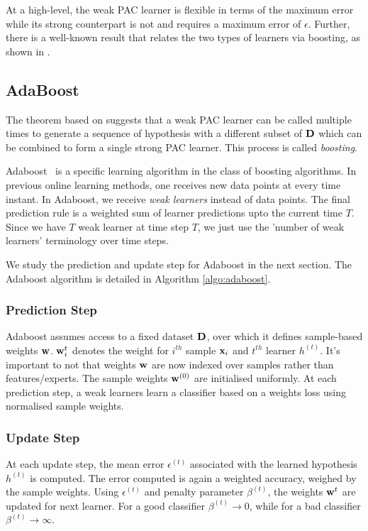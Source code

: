 \documentclass[11pt]{article}
\begin{document}
\normalfont
At a high-level, the weak PAC learner is flexible in terms of the maximum error while its strong
counterpart is not and requires a maximum error of $\epsilon$. Further, there is a well-known result that
relates the two types of learners via boosting, as shown in \cite{schapire1990strength}.

\subsection{AdaBoost}
The theorem based on \cite{schapire1990strength} suggests that a weak PAC learner can be called
multiple times to generate a sequence of hypothesis with a different subset of $\mathbf{D}$ which
can be combined to form a single strong PAC learner. This process is called \textit{boosting}.

Adaboost~\cite{freund1997decision} is a specific learning algorithm in the class of boosting algorithms. In previous online learning methods, one receives new data points at every time instant. In Adaboost, we receive \textit{weak learners} instead of data points. The final prediction rule is a weighted sum of learner predictions upto the current time $T$. Since we have $T$ weak learner at time step $T$, we just use the 'number of weak learners' terminology over time steps.

We study the prediction and update step for Adaboost in the next section. The Adaboost algorithm is detailed in Algorithm \ref{algo:adaboost}. 

\subsubsection{Prediction Step}
Adaboost assumes access to a fixed dataset $\mathbf{D}$, over which it defines sample-based weights $\mathbf{w}$. $\mathbf{w}^{t}_i$ denotes the weight for $i^{th}$ sample \ie $\mathbf{x}_i$ and $t^{th}$ learner $h^{(t)}$. It's important to not that weights $\mathbf{w}$ are now indexed over samples rather than features/experts. The sample weights $\mathbf{w}^{(0)}$ are initialised uniformly. At each prediction step, a weak learners learn a classifier based on a weights loss using normalised sample weights.

\subsubsection{Update Step}
At each update step, the mean error $\epsilon^{(t)}$ associated with the learned hypothesis $h^{(t)}$ is computed. The error computed is again a weighted accuracy, weighed by the sample weights. Using $\epsilon^{(t)}$ and penalty parameter $\beta^{(t)}$, the weights $\mathbf{w}^t$ are updated for next learner. For a good classifier $\beta^{(t)} \rightarrow 0$, while for a bad classifier $\beta^{(t)} \rightarrow \infty$.
\end{document}
